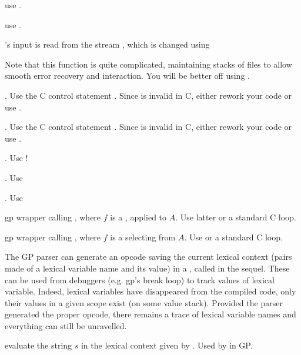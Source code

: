  use .

 use .


's input is read from the stream , which is changed
using


Note that this function is quite complicated, maintaining stacks of files
to allow smooth error recovery and  interaction. You will be better
off using .


. Use the C control statement . Since
 is invalid in C, either rework your code or use .

. Use the C control statement . Since
 is invalid in C, either rework your code or use .

. Use !

. Use 

. Use 

 gp wrapper calling , where $f$
is a , applied to $A$. Use  latter or a standard C
loop.

 gp wrapper calling , where $f$
is a  selecting from $A$. Use  or a standard C loop.


The GP parser can generate an opcode saving the current lexical context
(pairs made of a lexical variable name and its value) in a , called
 in the sequel. These can be used from debuggers (e.g. gp's break
loop) to track values of lexical variable. Indeed, lexical variables have
disappeared from the compiled code, only their values in a given scope exist
(on some value stack). Provided the parser generated the proper opcode, there
remains a trace of lexical variable names and everything can still be
unravelled.

 evaluate the string $s$
in the lexical context given by .  Used by  in GP.

